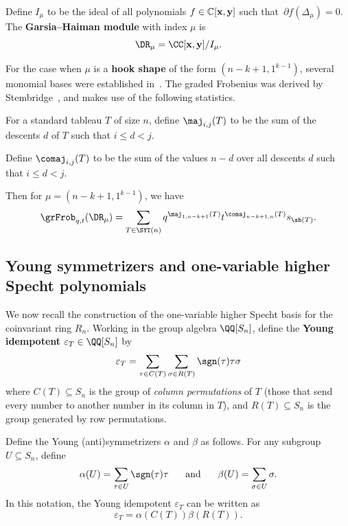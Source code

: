 \begin{definition}
	Define $I_\mu$ to be the ideal of all polynomials $f\in \mathbb{C}[{\bf x},{\bf y}]$ such that~$\partial f(\Delta_\mu)=0$.  The \textbf{Garsia--Haiman module} with index $\mu$ is $$\DR_\mu =\CC[{\bf x},{\bf y}]/I_\mu.$$
\end{definition}

For the case when $\mu$ is a \textbf{hook shape} of the form $(n-k+1,1^{k-1})$, several monomial bases were established in~\cite{HookBases}.  The graded Frobenius was derived by Stembridge~\cite{Stembridge}, and makes use of the following statistics.

\begin{definition}\label{def:maj-comaj}
	For a standard tableau $T$ of size $n$, define $\maj_{i,j}(T)$ to be the sum of the descents $d$ of $T$ such that $i\le d<j$.
	
	Define $\comaj_{i,j}(T)$ to be the sum of the values $n-d$ over all descents $d$ such that $i\le d <j$.
\end{definition}

Then for $\mu=(n-k+1,1^{k-1})$, we have~\cite{Stembridge} 
\begin{equation}\label{eq:stembridge}\grFrob_{q,t}(\DR_\mu)=\sum_{T\in \SYT(n)} q^{\maj_{1,n-k+1}(T)}t^{\comaj_{n-k+1,n}(T)}s_{\sh(T)}.\end{equation}



\subsection{Young symmetrizers and one-variable higher Specht polynomials}

We now recall the construction of the one-variable higher Specht basis for the coinvariant ring $R_n$.  Working in the group algebra $\QQ[S_n]$, define the \textbf{Young idempotent} $\varepsilon_T \in \QQ[S_n]$ by $$\varepsilon_T=\sum_{\tau \in C(T)}\sum_{\sigma \in R(T)}\sgn(\tau) \tau \sigma$$ where $C(T)\subseteq S_n$ is the group of \textit{column permutations}  of $T$ (those that send every number to another number in its column in $T$), and $R(T)\subseteq S_n$ is the group generated by row permutations.

Define the Young (anti)symmetrizers $\alpha$ and $\beta$ as follows.  For any subgroup $U\subseteq S_n$, define $$\alpha(U)=\sum_{\tau \in U}\sgn(\tau)\tau\hspace{0.5cm}\text{ and }  \hspace{0.5cm}\beta(U)=\sum_{\sigma\in U}\sigma.$$  In this notation, the Young idempotent $\varepsilon_T$ can be written as $$\varepsilon_T=\alpha(C(T))\beta(R(T)).$$

